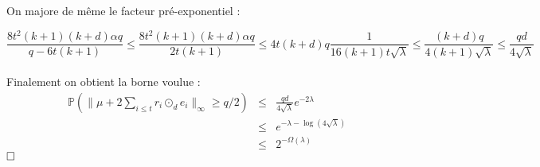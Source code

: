 \documentclass[11pt,a4paper]{article}
\begin{document}
On majore de même le facteur pré-exponentiel : 

\[
\frac{8t^2(k+1)(k+d)\alpha q}{q - 6t(k+1)} \leq \frac{8t^2(k+1)(k+d)\alpha q}{2t(k+1)}
\leq 4t(k+d)q\frac{1}{16(k+1)t\sqrt{\lambda}} 
\leq \frac{(k+d)q}{4(k+1)\sqrt{\lambda}}
\leq \frac{qd}{4\sqrt{\lambda}}
\]
\\

Finalement on obtient la borne voulue :
\begin{eqnarray*}
\mathbb{P}(\|\mu + 2\sum_{i \leq t}r_i \odot_d e_i  \|_\infty \geq q/2 ) &\leq&  \frac{qd}{4\sqrt{\lambda}}e^{-2\lambda} \\
&\leq& e^{-\lambda-\log(4\sqrt{\lambda})} \\
&\leq& 2^{-\Omega(\lambda)}
\end{eqnarray*}
$\hfill \square$


\printbibliography[heading=bibintoc, title={Références}]
\end{document}
